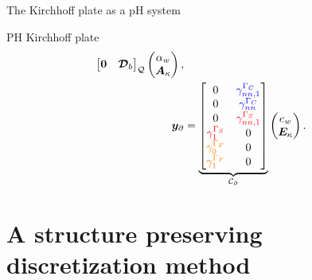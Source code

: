 \documentclass[aspectratio=169]{ISAE-Beamer}
\begin{document}
\begin{frame}{The Kirchhoff plate as a pH system}
\begin{block}{PH Kirchhoff plate}
\begin{equation*}
\begin{aligned}
{\begin{bmatrix}
		\bm{0} & \bm{\mathcal{D}}_b \\
		\end{bmatrix}}_{\mathcal{Q}}
		\begin{pmatrix}
		\alpha_w \\
		\bm{A}_{\kappa} \\
		\end{pmatrix}, \\
		\bm{y}_\partial &= \underbrace{
			\begin{bmatrix}
			{0} & \textcolor{blue}{\gamma_{nn, 1}^{\Gamma_C}} \\
			{0} & \textcolor{blue}{\gamma_{nn}^{\Gamma_C}} \\
			{0} & \textcolor{red}{\gamma_{nn, 1}^{\Gamma_S}} \\
			\textcolor{red}{\gamma_{1}^{\Gamma_S}} & {0} \\
			\textcolor{orange}{\gamma_{0}^{\Gamma_F}} & {0} \\
			\textcolor{orange}{\gamma_{1}^{\Gamma_F}} & {0} \\
			\end{bmatrix}}_{\mathcal{C}_\partial}
		\begin{pmatrix}
		e_w \\
		\bm{E}_{\kappa} \\
		\end{pmatrix}.
		\end{aligned}
		\end{equation*}
	\end{block}
\end{frame}





\section{A structure preserving discretization method}
\end{document}
